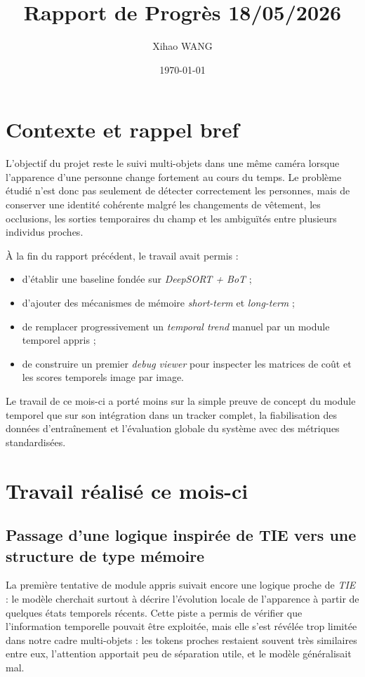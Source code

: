 \documentclass[11pt,a4paper]{article}
\title{Rapport de Progrès 18/05/2026}
\author{Xihao WANG}
\date{\today}
\begin{document}
\maketitle

\section{Contexte et rappel bref}

L'objectif du projet reste le suivi multi-objets dans une même caméra lorsque l'apparence d'une personne change fortement au cours du temps. Le problème étudié n'est donc pas seulement de détecter correctement les personnes, mais de conserver une identité cohérente malgré les changements de vêtement, les occlusions, les sorties temporaires du champ et les ambiguïtés entre plusieurs individus proches.

À la fin du rapport précédent, le travail avait permis :
\begin{itemize}
    \item d'établir une baseline fondée sur \textit{DeepSORT + BoT} ;
    \item d'ajouter des mécanismes de mémoire \textit{short-term} et \textit{long-term} ;
    \item de remplacer progressivement un \textit{temporal trend} manuel par un module temporel appris ;
    \item de construire un premier \textit{debug viewer} pour inspecter les matrices de coût et les scores temporels image par image.
\end{itemize}

Le travail de ce mois-ci a porté moins sur la simple preuve de concept du module temporel que sur son intégration dans un tracker complet, la fiabilisation des données d'entraînement et l'évaluation globale du système avec des métriques standardisées.

\section{Travail réalisé ce mois-ci}

\subsection{Passage d'une logique inspirée de TIE vers une structure de type mémoire}

La première tentative de module appris suivait encore une logique proche de \textit{TIE} : le modèle cherchait surtout à décrire l'évolution locale de l'apparence à partir de quelques états temporels récents. Cette piste a permis de vérifier que l'information temporelle pouvait être exploitée, mais elle s'est révélée trop limitée dans notre cadre multi-objets : les tokens proches restaient souvent très similaires entre eux, l'attention apportait peu de séparation utile, et le modèle généralisait mal.
\end{document}
